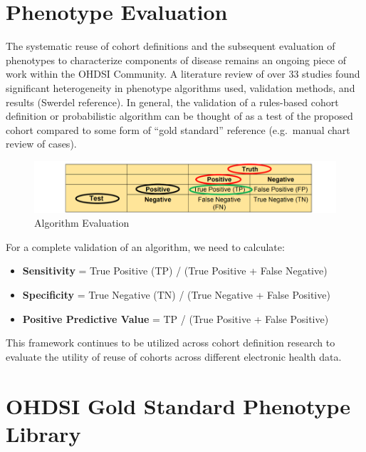 \documentclass[11pt]{book}
\theoremstyle{definition}
\theoremstyle{definition}
\theoremstyle{definition}
\theoremstyle{remark}
\begin{document}
\hypertarget{phenotype-evaluation}{%
\section{Phenotype Evaluation}\label{phenotype-evaluation}}

The systematic reuse of cohort definitions and the subsequent evaluation of phenotypes to characterize components of disease remains an ongoing piece of work within the OHDSI Community. A literature review of over 33 studies found significant heterogeneity in phenotype algorithms used, validation methods, and results (Swerdel reference). In general, the validation of a rules-based cohort definition or probabilistic algorithm can be thought of as a test of the proposed cohort compared to some form of ``gold standard'' reference (e.g.~manual chart review of cases).

\begin{figure}
\includegraphics[width=1\linewidth]{images/Cohorts/cohort-PPV} \caption{Algorithm Evaluation}\label{fig:cohortPpv}
\end{figure}

For a complete validation of an algorithm, we need to calculate:

\begin{itemize}
\item
  \textbf{Sensitivity} = True Positive (TP) / (True Positive + False Negative)
\item
  \textbf{Specificity} = True Negative (TN) / (True Negative + False Positive)
\item
  \textbf{Positive Predictive Value} = TP / (True Positive + False Positive)
\end{itemize}

This framework continues to be utilized across cohort definition research to evaluate the utility of reuse of cohorts across different electronic health data.

\hypertarget{ohdsi-gold-standard-phenotype-library}{%
\section{OHDSI Gold Standard Phenotype Library}\label{ohdsi-gold-standard-phenotype-library}}
\end{document}
